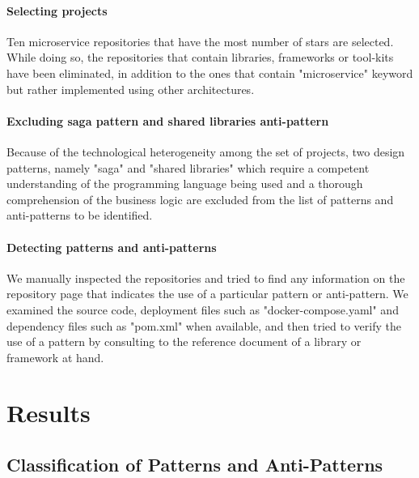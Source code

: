 \documentclass[11pt,a4paper,twocolumn]{article}
\begin{document}
\paragraph{Selecting projects}
Ten microservice repositories that have the most number of stars are selected.
While doing so, the repositories that contain libraries, frameworks or tool-kits have been eliminated, in addition to the ones that contain "microservice" keyword but rather implemented using other architectures.

\paragraph{Excluding saga pattern and shared libraries anti-pattern}
Because of the technological heterogeneity among the set of projects, two design patterns, namely "saga" and "shared libraries" which require a competent understanding of the programming language being used and a thorough comprehension of the business logic are excluded from the list of patterns and anti-patterns to be identified.

\paragraph{Detecting patterns and anti-patterns}
We manually inspected the repositories and tried to find any information on the repository page that indicates the use of a particular pattern or anti-pattern. We examined the source code, deployment files such as "docker-compose.yaml" and dependency files such as "pom.xml" when available, and then tried to verify the use of a pattern by consulting to the reference document of a library or framework at hand.

\section{Results}
\label{sec:result}

\subsection{Classification of Patterns and Anti-Patterns}
\label{subsec:rq1}
\end{document}
